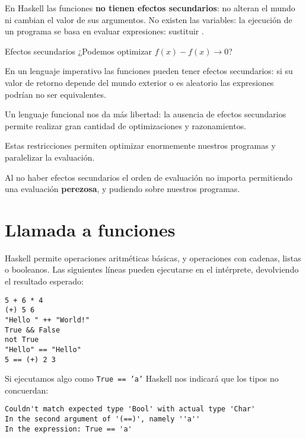 En Haskell las funciones \textbf{no tienen efectos secundarios}: no alteran el
mundo ni cambian el valor de sus argumentos. No existen las variables: la
ejecución de un programa se basa en evaluar expresiones: sustituir
.

\begin{otro}{Efectos secundarios}
  ¿Podemos optimizar $ f(x) - f(x) \rightarrow 0$?

  \espacio

  En un lenguaje imperativo las funciones pueden tener efectos secundarios:
  si su valor de retorno depende del mundo exterior o es aleatorio las expresiones
  podrían no ser equivalentes.

  \espacio

  Un lenguaje funcional nos da más libertad: la ausencia de efectos secundarios
  permite realizar gran cantidad de optimizaciones y razonamientos.
\end{otro}

Estas restricciones permiten optimizar enormemente nuestros programas y paralelizar
la evaluación.

Al no haber efectos secundarios el orden de evaluación no importa permitiendo una
evaluación \textbf{perezosa}, y pudiendo
 sobre nuestros programas.


\section{Llamada a funciones}

Haskell permite operaciones aritméticas básicas, y operaciones con
cadenas, listas o booleanos. Las siguientes líneas pueden ejecutarse en el
intérprete, devolviendo el resultado esperado:

\begin{lstlisting}
5 + 6 * 4
(+) 5 6
"Hello " ++ "World!"
True && False
not True
"Hello" == "Hello"
5 == (+) 2 3
\end{lstlisting}

Si ejecutamos algo como \texttt{True == 'a'} Haskell nos indicará que los tipos
no concuerdan:

\begin{lstlisting}
Couldn't match expected type 'Bool' with actual type 'Char'
In the second argument of '(==)', namely ''a''
In the expression: True == 'a'
\end{lstlisting}

